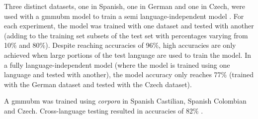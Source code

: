Three distinct datasets, one in Spanish, one in German and one in Czech, were used with a \gls{gmmubm} model to train a semi language-independent model \cite{parkinson_three_languages}. For each experiment, the model was trained with one dataset and tested with another (adding to the training set subsets of the test set with percentages varying from 10\% and 80\%). Despite reaching accuracies of 96\%, high accuracies are only achieved when large portions of the test language are used to train the model. In a fully language-independent model (where the model is trained using one language and tested with another), the model accuracy only reaches 77\% (trained with the German dataset and tested with the Czech dataset).

A \gls{gmmubm} was trained using \textit{corpora} in Spanish Castilian, Spanish Colombian and Czech. Cross-language testing resulted in accuracies of 82\% \cite{parkinson_phonemic_relevance}.

